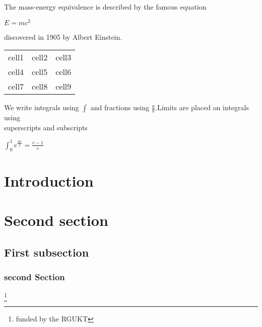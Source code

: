 \documentclass{article}
\begin{document}
\begin{flushleft}
The mass-energy equivalence is described by the famous equation\\
\begin{center}
\vspace{2mm}
$E=mc^2$
\end{center}
discovered in 1905 by Albert Einstein.
\end{flushleft}
\begin{center}
\begin{tabular}{|c c c|}
\hline
cell1 & cell2 & cell3\\
cell4 & cell5 & cell6\\
cell7 & cell8 & cell9\\
\hline
\end{tabular}
\end{center}
\begin{flushleft}
We write integrals using $\int$ and fractions using $\frac{a}{b}$.Limits are placed on integrals using\\superscripts and subscripts
\end{flushleft}
\begin{center}
$\int_0  ^1e^\frac{dx}{x}=\frac{e-1}{e}$
\end{center}
\begin{flushleft}
\section{Introduction}
\section{Second section}
\subsection{First subsection}
\subsubsection{second Section}
\end{flushleft}
\footnote{funded by the RGUKT}
\end{document}
